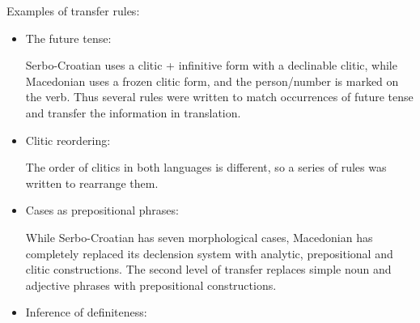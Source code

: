 \documentclass{book}
\begin{document}
Examples of transfer rules:

\begin{itemize}
\item The future tense:

Serbo-Croatian uses a clitic + infinitive form with a declinable clitic, while
Macedonian uses a frozen clitic form, and the person/number is marked on the verb.
Thus several rules were written to match occurrences of future tense
and transfer the information in translation.

\item Clitic reordering:


The order of clitics in both languages is different, so a series of rules was written to rearrange them.

\item Cases as prepositional phrases:


While Serbo-Croatian has seven morphological cases, Macedonian has 
completely replaced its declension system with analytic, prepositional and clitic constructions.
The second level of transfer replaces simple noun and adjective phrases with prepositional constructions.

\item Inference of definiteness:

\end{itemize}
\end{document}
